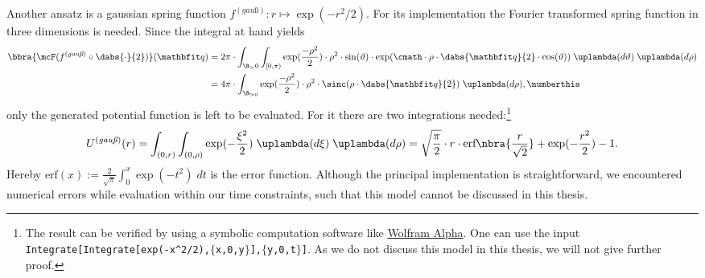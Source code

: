 Another ansatz is a gaussian spring function $f^{(\textit{gauß})}:r\mapsto \exp(-r^2/2)$. For its implementation the Fourier transformed spring function in three dimensions is needed. Since the integral at hand yields
\begin{align*}
    \bbra{\mcF (f^{(\textit{gauß})}\circ\dabs{\cdot}{2})}(\vq) &= 2\pi\cdot\int_{\R_>0}\int_{[0,\pi)}\exp(\frac{-\rho^2}{2})\cdot\rho^2\cdot\sin(\vartheta)\cdot\exp(\cmath\cdot\rho\cdot \dabs{\vq}{2}\cdot\cos(\vartheta))\;\uplambda(d\vartheta)\;\uplambda(d\rho) \\
    &= 4\pi\cdot\int_{\R_{>0}}\exp(\frac{-\rho^2}{2})\cdot\rho^2\cdot\sinc(\rho\cdot \dabs{\vq}{2})\;\uplambda(d\rho), \numberthis\label{eq:FourierGaussian}
\end{align*}
only the generated potential function is left to be evaluated. For it there are two integrations needed:\footnote{The result can be verified by using a symbolic computation software like \href{https://www.wolframalpha.com/}{Wolfram Alpha}. One can use the input \texttt{Integrate[Integrate[exp(-x\textasciicircum 2/2),$\{$x,0,y$\}$],$\{$y,0,t$\}$]}. As we do not discuss this model in this thesis, we will not give further proof.}
\[
    U^{(\textit{gauß})}(r) = \int_{(0,r)}\int_{(0,\rho)}\exp(-\frac{\xi^2}{2})\;\uplambda(d\xi)\;\uplambda(d\rho) = \sqrt{\frac{\pi}{2}}\cdot r\cdot\text{erf}\nbra{\frac{r}{\sqrt{2}}} + \exp(-\frac{r^2}{2}) - 1.
\]
Hereby $\text{erf}(x):= \frac{2}{\sqrt{\pi}}\int_{0}^{x}\exp(-t^2)\;dt$ is the error function. Although the principal implementation is straightforward, we encountered numerical errors while evaluation within our time constraints, such that this model cannot be discussed in this thesis. \\